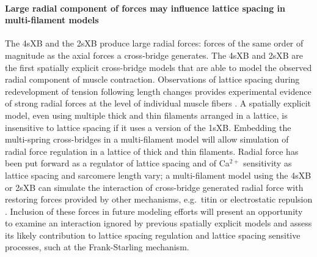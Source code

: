 \documentclass[]{article}
\begin{document}
\paragraph{Large radial component of forces may influence lattice spacing in multi-filament models} %
The 4sXB and the 2sXB produce large radial forces: forces of the same order of magnitude as the axial forces a cross-bridge generates. 
The 4sXB and 2sXB are the first spatially explicit cross-bridge models that are able to model the observed radial component of muscle contraction.
Observations of lattice spacing during redevelopment of tension following length changes provides experimental evidence of strong radial forces at the level of individual muscle fibers \citep{Cecchi1990}. %
A spatially explicit model, even using multiple thick and thin filaments arranged in a lattice, is insensitive to lattice spacing if it uses a version of the 1sXB.
Embedding the multi-spring cross-bridges in a multi-filament model will allow simulation of radial force regulation in a lattice of thick and thin filaments.  
Radial force has been put forward as a regulator of lattice spacing and of Ca$^{2+}$ sensitivity as lattice spacing and sarcomere length vary; a multi-filament model using the 4sXB or 2sXB can simulate the interaction of cross-bridge generated radial force with restoring forces provided by other mechanisms, e.g.\ titin or electrostatic repulsion \citep{Martyn2004, Cazorla2001}. %
Inclusion of these forces in future modeling efforts will present an opportunity to examine an interaction ignored by previous spatially explicit models and assess its likely contribution to lattice spacing regulation and lattice spacing sensitive processes, such at the Frank-Starling mechanism. %
\end{document}
